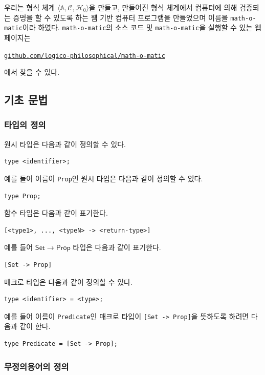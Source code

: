 \documentclass[10pt,twocolumn]{article}
\theoremstyle{definition}
\newcommand{\Prop}{\mathsf{Prop}}
\newcommand{\Set}{\mathsf{Set}}
\begin{document}
우리는 형식 체계 $\langle\mathbb A, \mathcal C, \mathcal H_0\rangle$을 만들고, 만들어진 형식 체계에서 컴퓨터에 의해 검증되는 증명을 할 수 있도록 하는 웹 기반 컴퓨터 프로그램을 만들었으며 이름을 \texttt{math-o-matic}이라 하였다. \texttt{math-o-matic}의 소스 코드 및 \texttt{math-o-matic}을 실행할 수 있는 웹 페이지는
\begin{center}
	\href{https://github.com/logico-philosophical/math-o-matic}{\texttt{github.com/logico-philosophical/math-o-matic}}
\end{center}
에서 찾을 수 있다.

\subsection{기초 문법}

\subsubsection{타입의 정의}

원시 타입은 다음과 같이 정의할 수 있다.

\begin{lstlisting}
type <identifier>;
\end{lstlisting}
예를 들어 이름이 \verb!Prop!인 원시 타입은 다음과 같이 정의할 수 있다.
\begin{lstlisting}
type Prop;
\end{lstlisting}

함수 타입은 다음과 같이 표기한다.
\begin{lstlisting}
[<type1>, ..., <typeN> -> <return-type>]
\end{lstlisting}
예를 들어 $\Set\to\Prop$ 타입은 다음과 같이 표기한다.
\begin{lstlisting}
[Set -> Prop]
\end{lstlisting}

매크로 타입은 다음과 같이 정의할 수 있다.
\begin{lstlisting}
type <identifier> = <type>;
\end{lstlisting}
예를 들어 이름이 \verb!Predicate!인 매크로 타입이 \verb![Set -> Prop]!을 뜻하도록 하려면 다음과 같이 한다.
\begin{lstlisting}
type Predicate = [Set -> Prop];
\end{lstlisting}

\subsubsection{무정의용어의 정의}
\end{document}
